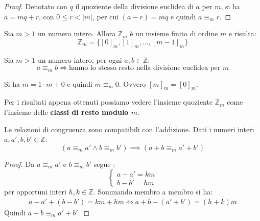 \begin{proof}
	Denotato con $q$ il quoziente della divisione euclidea di $a$ per $m$, si ha $a=mq+r$, con $0 \leq r < |m|$, per cui $(a-r) =mq$ e quindi $a \equiv_{m} r$.
\end{proof}


\begin{teorbox}
	Sia $m>1$ un numero intero. Allora $\mathbb{Z}_{m}$ è un insieme finito di ordine $m$ e risulta:
	\begin{displaymath}
		\mathbb{Z}_{m} = \{[0]_{m},[1]_{m},\ldots,[m-1]_{m}\}
	\end{displaymath}
\end{teorbox}


\begin{corolbox}
	Sia $m>1$ un numero intero, per ogni $a,b \in \mathbb{Z}$:
	\begin{displaymath}
		a \equiv_{m} b \iff \text{hanno lo stesso resto nella divisione euclidea per $m$}
	\end{displaymath}
\end{corolbox}

\begin{osservation}
	Si ha $m = 1 \cdot m + 0$ e quindi $m \equiv_{m} 0$. Ovvero $[m]_{m}=[0]_{m}$.
\end{osservation}

Per i risultati appena ottenuti possiamo vedere l'insieme quoziente $\mathbb{Z}_{m}$ come l'insieme delle \textbf{classi di resto modulo $m$}.


\begin{propbox}
	Le relazioni di congruenza sono compatibili con l'addizione. Dati i numeri interi $a,a',b,b' \in \mathbb{Z}$:
	\begin{equation}
	(a \equiv_{m} a' \land b \equiv_{m} b') \implies (a+b \equiv_{m} a'+b')
	\end{equation}
\end{propbox}

\begin{proof}
	Da $a \equiv_{m} a'$ e $b \equiv_{m} b'$ segue :
	\[
	\begin{cases}
		a-a' = km \\
		b-b' = hm
	\end{cases}
	\] per opportuni interi $h,k \in \mathbb{Z}$. Sommando membro a membro si ha:
	\begin{align*}
		a-a'+(b-b') = km+hm  \iff	a+b - (a'+b') = (h+k)m
	\end{align*}
	Quindi $a+b \equiv_{m} a'+b'$.
\end{proof}


